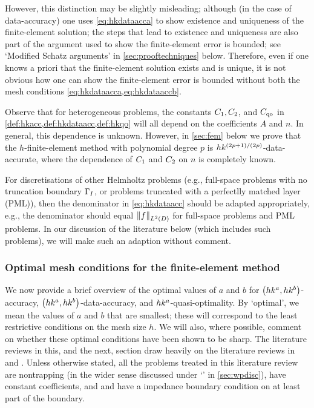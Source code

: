 However, this distinction may be slightly misleading; although (in the case of data-accuracy) one uses \cref{eq:hkdataacca} to show existence and uniqueness of the finite-element solution; the steps that lead to existence and uniqueness are also part of the argument used to show the finite-element error is bounded; see `Modified Schatz arguments' in \cref{sec:prooftechniques} below. Therefore, even if one knows a priori that the finite-element solution exists and is unique, it is not obvious how one can show the finite-element error is bounded without both the mesh conditions \cref{eq:hkdataacca,eq:hkdataaccb}.
\ere

Observe that for heterogeneous problems, the constants $C_{1}, C_{2}$, and $C_{\mathrm{qo}}$ in \cref{def:hkacc,def:hkdataacc,def:hkqo} will all depend on the coefficients $A$ and $n.$ In general, this dependence is unknown. However, in \cref{sec:fem} below we prove that the $h$-finite-element method with polynomial degree $p$ is $hk^{(2p+1)/(2p)}$-data-accurate, where the dependence of $C_{1}$ and $C_{2}$ on $n$ is completely known.
\ere

For discretisations of other Helmholtz problems (e.g., full-space problems with no truncation boundary $\Gamma_{I}$, or problems truncated with a perfectlly matched layer (PML)), then the denominator in \cref{eq:hkdataacc} should be adapted appropriately, e.g., the denominator should equal $\NLtD{f}$ for full-space problems and PML problems. In our discussion of the literature below (which includes such problems), we will make such an adaption without comment.
\ere


\subsubsection{Optimal mesh conditions for the finite-element method}

We now provide a brief overview of the optimal values of $a$ and $b$ for $\hk{a}{b}$-accuracy, $\hk{a}{b}$-data-accuracy, and $hk^{a}$-quasi-optimality. By `optimal', we mean the values of $a$ and $b$ that are smallest; these will correspond to the least restrictive conditions on the mesh size $h$. We will also, where possible, comment on whether these optimal conditions have been shown to be sharp. The literature reviews in this, and the next, section draw heavily on the literature reviews in \cite[pp. 182--183]{GrLoMeSp:14} and \cite[p. 112]{DiMoSp:19}. Unless otherwise stated, all the problems treated in this literature review are nontrapping (in the wider sense discussed under `\techtitle' in \cref{sec:wpdisc}), have constant coefficients, and and have a impedance boundary condition on at least part of the boundary.

